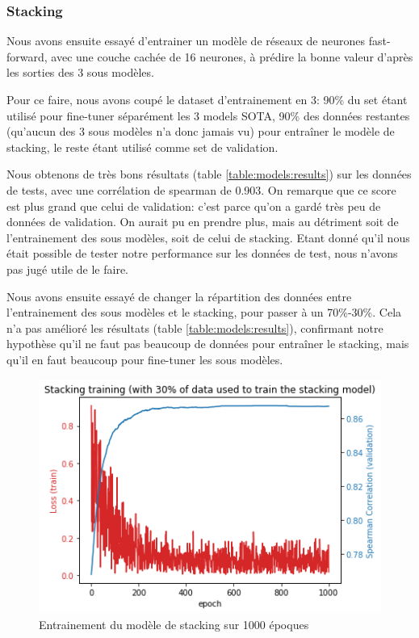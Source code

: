\documentclass[11pt,a4paper, french]{article}
\begin{document}
%
\subsubsection{Stacking}

Nous avons ensuite essayé d'entrainer un modèle de réseaux de neurones fast-forward, avec une couche cachée de 16 neurones, à prédire la bonne valeur d'après les sorties des 3 sous modèles.

Pour ce faire, nous avons coupé le dataset d'entrainement en 3: 90\% du set étant utilisé pour fine-tuner séparément les 3 models SOTA, 90\% des données restantes (qu'aucun des 3 sous modèles n'a donc jamais vu) pour entraîner le modèle de stacking, le reste étant utilisé comme set de validation.

Nous obtenons de très bons résultats (table \ref{table:models:results}) sur les données de tests, avec une corrélation de spearman de 0.903. On remarque que ce score est plus grand que celui de validation: c'est parce qu'on a gardé très peu de données de validation. On aurait pu en prendre plus, mais au détriment soit de l'entrainement des sous modèles, soit de celui de stacking. Etant donné qu'il nous était possible de tester notre performance sur les données de test, nous n'avons pas jugé utile de le faire.

Nous avons ensuite essayé de changer la répartition des données entre l'entrainement des sous modèles et le stacking, pour passer à un 70\%-30\%. Cela n'a pas amélioré les résultats (table \ref{table:models:results}), confirmant notre hypothèse qu'il ne faut pas beaucoup de données pour entraîner le stacking, mais qu'il en faut beaucoup pour fine-tuner les sous modèles.

\begin{figure}
  \includegraphics[width=\linewidth]{resources/stack-30-training.png}
  \caption{Entrainement du modèle de stacking sur 1000 époques}
  \label{fig:stack:train}
\end{figure}
\end{document}

